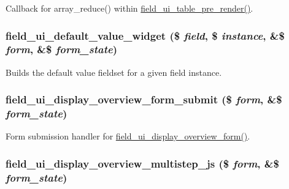 Callback for array\_\-reduce() within \hyperlink{field__ui_8admin_8inc_a3aaaf5a32e48e5cebdae7abb960fb0fc}{field\_\-ui\_\-table\_\-pre\_\-render()}. \hypertarget{field__ui_8admin_8inc_a2f64b5b1584120d25be152298d7d422f}{
\subsubsection[{field\_\-ui\_\-default\_\-value\_\-widget}]{\setlength{\rightskip}{0pt plus 5cm}field\_\-ui\_\-default\_\-value\_\-widget (\$ {\em field}, \/  \$ {\em instance}, \/  \&\$ {\em form}, \/  \&\$ {\em form\_\-state})}}
\label{field__ui_8admin_8inc_a2f64b5b1584120d25be152298d7d422f}
Builds the default value fieldset for a given field instance. \hypertarget{field__ui_8admin_8inc_a06179df88eafaa552c7eeb5fdd144ccf}{
\subsubsection[{field\_\-ui\_\-display\_\-overview\_\-form\_\-submit}]{\setlength{\rightskip}{0pt plus 5cm}field\_\-ui\_\-display\_\-overview\_\-form\_\-submit (\$ {\em form}, \/  \&\$ {\em form\_\-state})}}
\label{field__ui_8admin_8inc_a06179df88eafaa552c7eeb5fdd144ccf}
Form submission handler for \hyperlink{group__forms_gad03c0a01179bc9ebb22b5c35784e1abf}{field\_\-ui\_\-display\_\-overview\_\-form()}. \hypertarget{field__ui_8admin_8inc_abd91546e06594b68f40656e84141cacd}{
\subsubsection[{field\_\-ui\_\-display\_\-overview\_\-multistep\_\-js}]{\setlength{\rightskip}{0pt plus 5cm}field\_\-ui\_\-display\_\-overview\_\-multistep\_\-js (\$ {\em form}, \/  \&\$ {\em form\_\-state})}}
